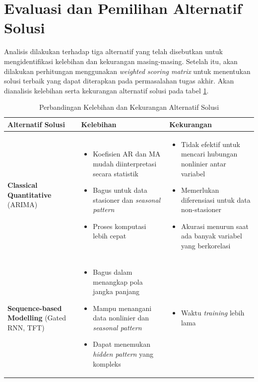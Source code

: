 \section{Evaluasi dan Pemilihan Alternatif Solusi}
Analisis dilakukan terhadap tiga alternatif yang telah disebutkan untuk mengidentifikasi kelebihan dan kekurangan masing-masing. Setelah itu, akan dilakukan perhitungan menggunakan \textit{weighted scoring matrix} untuk menentukan solusi terbaik yang dapat diterapkan pada permasalahan tugas akhir. Akan dianalisis kelebihan serta kekurangan alternatif solusi pada tabel \ref{table:comparative}. 

\begin{table}[H]
\caption{Perbandingan Kelebihan dan Kekurangan Alternatif Solusi}
\label{table:comparative}
\begin{tabular}{|p{4cm}|p{5cm}|p{5cm}|}
\hline
\textbf{Alternatif Solusi} & \textbf{Kelebihan} & \textbf{Kekurangan} \\
\hline
\textbf{Classical Quantitative} \newline (ARIMA) & 
\begin{itemize}
    \item Koefisien AR dan MA mudah diinterpretasi secara statistik
    \item Bagus untuk data stasioner dan \textit{seasonal pattern}
    \item Proses komputasi lebih cepat
\end{itemize} & 
\begin{itemize}
    \item Tidak efektif untuk mencari hubungan nonlinier antar variabel
    \item Memerlukan diferensiasi untuk data non-stasioner
    \item Akurasi menurun saat ada banyak variabel yang berkorelasi
\end{itemize} \\
\hline
\textbf{Sequence-based Modelling} \newline (Gated RNN, TFT) & 
\begin{itemize}
    \item Bagus dalam menangkap pola jangka panjang
    \item Mampu menangani data nonlinier dan \textit{seasonal pattern}
    \item Dapat menemukan \textit{hidden pattern} yang kompleks
\end{itemize} & 
\begin{itemize}
    \item Waktu \textit{training} lebih lama

\end{itemize}
\end{tabular}
\end{table}
